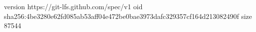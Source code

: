 version https://git-lfs.github.com/spec/v1
oid sha256:4be3280e62fd085ab53aff04e472be0bae3973dafc329357cf164d213082490f
size 87544
